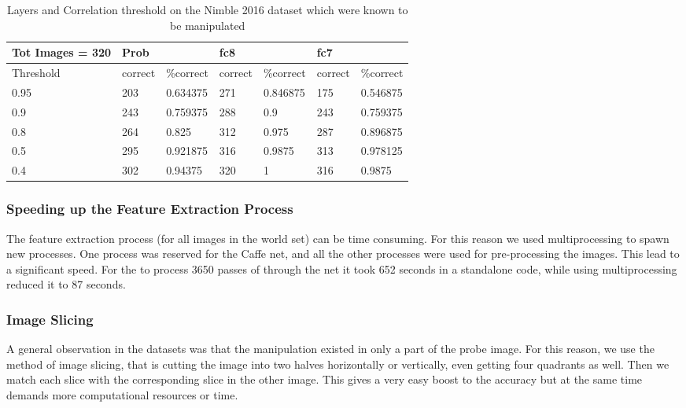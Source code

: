 \documentclass{article}
\begin{document}
\begin{table}[H]
\centering
\caption{Layers and Correlation threshold on the Nimble 2016 dataset which were known to be manipulated}
\label{lct}
\begin{tabular}{|l|l|l|l|l|ll|}
  \hline
  Tot Images = 320 & \multicolumn{2}{|l|}{Prob} & \multicolumn{2}{|l|}{fc8} & \multicolumn{2}{|l|}{fc7} \\
  \hline
  \multicolumn{1}{|l|}{Threshold} & correct    & \%correct   & correct   & \%correct   & correct   & \%correct   \\
  \hline
  0.95             & 203        & 0.634375    & 271       & 0.846875    & 175       & 0.546875    \\
  0.9              & 243        & 0.759375    & 288       & 0.9         & 243       & 0.759375    \\
  0.8              & 264        & 0.825       & 312       & 0.975       & 287       & 0.896875    \\
  0.5              & 295        & 0.921875    & 316       & 0.9875      & 313       & 0.978125    \\
  0.4              & 302        & 0.94375     & 320       & 1           & 316       & 0.9875      \\
  \hline

\end{tabular}
\end{table}

\subsubsection{Speeding up the Feature Extraction Process}
The feature extraction process (for all images in the world set) can be time consuming. For this reason we used multiprocessing to spawn new processes. One process was reserved for the Caffe net, and all the other processes were used for pre-processing the images. This lead to a significant speed. For the to process 3650 passes of through the net it took 652 seconds in a standalone code, while using multiprocessing reduced it to 87 seconds.


\subsubsection{Image Slicing}
A general observation in the datasets was that the manipulation existed in only a part of the probe image. For this reason, we use the method of image slicing, that is cutting the image into two halves horizontally or vertically, even getting four quadrants as well. Then we match each slice with the corresponding slice in the other image. This gives a very easy boost to the accuracy but at the same time demands more computational resources or time.
\end{document}
